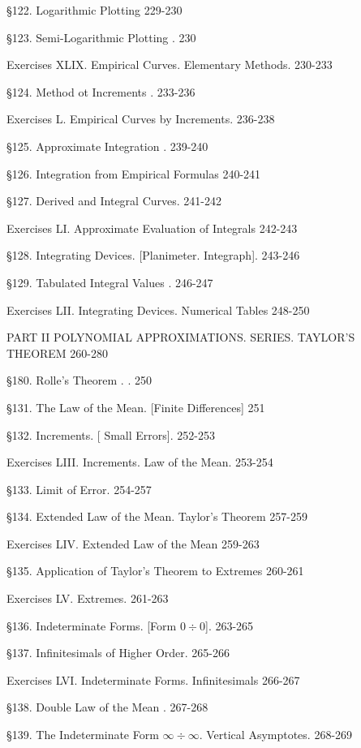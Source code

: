 \documentclass[12pt]{article}
\begin{document}
\S 122. Logarithmic Plotting 229-230

\S 123. Semi-Logarithmic Plotting .  230

Exercises XLIX. Empirical Curves. Elementary Methods. 230-233

\S 124. Method ot Increments .  233-236

Exercises L. Empirical Curves by Increments. 236-238

\S 125. Approximate Integration . 239-240

\S 126. Integration from Empirical Formulas 240-241

\S 127. Derived and Integral Curves. 241-242

Exercises LI. Approximate Evaluation of Integrals 242-243

\S 128. Integrating Devices. [Planimeter. Integraph]. 243-246


\S 129. Tabulated Integral Values .  246-247

Exercises LII. Integrating Devices. Numerical Tables 248-250

\begin{center}
PART II POLYNOMIAL APPROXIMATIONS. SERIES.
TAYLOR'S THEOREM 260-280
\end{center}

\S 180. Rolle's Theorem . . 250

\S 131. The Law of the Mean. [Finite Differences] 251

\S 132. Increments. [ Small Errors]. 252-253

Exercises LIII. Increments. Law of the Mean. 253-254

\S 133. Limit of Error.  254-257

\S 134. Extended Law of the Mean. Taylor's Theorem 257-259

Exercises LIV. Extended Law of the Mean 259-263

\S 135. Application of Taylor's Theorem to Extremes 260-261

Exercises LV. Extremes. 261-263

\S 136. Indeterminate Forms. [Form $0\div 0$]. 263-265

\S 137. Infinitesimals of Higher Order. 265-266

Exercises LVI. Indeterminate Forms. Infinitesimals 266-267

\S 138. Double Law of the Mean . 267-268

\S 139. The Indeterminate Form $\infty\div\infty$. Vertical Asymptotes. 268-269
\end{document}
